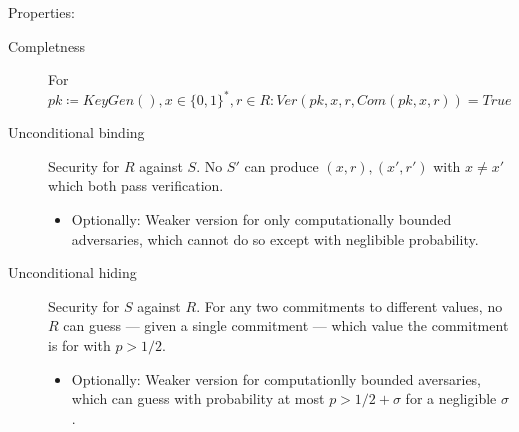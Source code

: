 Properties:
\begin{description}
		\item[Completness] For $pk \coloneqq KeyGen(), x \in \{0, 1\}^*, r \in
				R: Ver(pk, x, r, Com(pk, x, r)) = True$
		\item[Unconditional binding] Security for $R$ against $S$. No $S'$ can produce $(x,
				r), (x', r')$ with $x \neq x'$ which both pass verification.
				\begin{itemize}
						\item Optionally: Weaker version for only
								computationally bounded adversaries, which
								cannot do so except with neglibible
								probability.
				\end{itemize}
		\item[Unconditional hiding] Security for $S$ against $R$. For any two
				commitments to different values, no $R$ can guess --- given a
				single commitment --- which value the commitment is for with $p
				> 1/2$.
				\begin{itemize}
						\item Optionally: Weaker version for computationlly
								bounded aversaries, which can guess with
								probability at most $p > 1/2 + \sigma$ for a
								negligible $\sigma$.
				\end{itemize}
\end{description}
